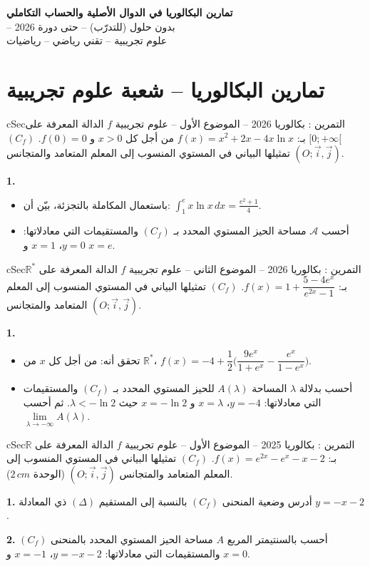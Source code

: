 \documentclass[12pt,a4paper]{article}
\newenvironment{BOX}[2]{\begin{otherlanguage}{english}\begin{arbox}{#1}{#2}}{\end{arbox}\end{otherlanguage}}
\newcounter{exo}
\newenvironment{tamrin}[1]{\stepcounter{exo}\begin{BOX}{cSec}{التمرين \theexo: #1}}{\end{BOX}}
\newenvironment{LTR}{\begin{otherlanguage}{english}}{\end{otherlanguage}}
\newcommand{\R}{\mathbb{R}}
\newenvironment{sq}{\begin{itemize}[leftmargin=2.4em,itemsep=3pt]}{\end{itemize}}
\newcommand{\qa}{\item[(أ)]}\newcommand{\qb}{\item[(ب)]}\newcommand{\qc}{\item[(جـ)]}\newcommand{\qd}{\item[(د)]}\newcommand{\qe}{\item[(هـ)]}
\newcommand{\QQ}[1]{\par\smallskip\textbf{#1.} }
\begin{document}
\begin{LTR}
\begin{tcolorbox}[enhanced,colback=cSec,colframe=cSec,arc=3mm,halign=center,boxrule=0pt,top=12pt,bottom=12pt,before upper={\selectlanguage{arabic}}]
{\color{white}\fontsize{22}{28}\selectfont\bfseries تمارين البكالوريا في الدوال الأصلية والحساب التكاملي}\\[8pt]
{\color{white}\large -- بدون حلول (للتدرّب) -- حتى دورة 2026}\\[5pt]
{\color{white}\large علوم تجريبية -- تقني رياضي -- رياضيات}
\end{tcolorbox}
\end{LTR}
\section{تمارين البكالوريا -- شعبة علوم تجريبية}
\begin{tamrin}{بكالوريا 2026 -- الموضوع الأول -- علوم تجريبية}
$f$ الدالة المعرفة على $[0;+\infty[$ بـ: $f(x)=x^2+2x-4x\ln x$ من أجل كل $x>0$ و $f(0)=0$.
$(C_f)$ تمثيلها البياني في المستوي المنسوب إلى المعلم المتعامد والمتجانس $(O;\vec i,\vec j)$.
\QQ{1}
\begin{sq}
\qa باستعمال المكاملة بالتجزئة، بيّن أن: $\displaystyle\int_1^e x\ln x\,dx=\frac{e^2+1}{4}$.
\qb أحسب $\mathcal{A}$ مساحة الحيز المستوي المحدد بـ $(C_f)$ والمستقيمات التي معادلاتها: $y=0$، $x=1$ و $x=e$.
\end{sq}
\end{tamrin}

\begin{tamrin}{بكالوريا 2026 -- الموضوع الثاني -- علوم تجريبية}
$f$ الدالة المعرفة على $\R^*$ بـ: $f(x)=1+\dfrac{5-4e^x}{e^{2x}-1}$.
$(C_f)$ تمثيلها البياني في المستوي المنسوب إلى المعلم المتعامد والمتجانس $(O;\vec i,\vec j)$.
\QQ{1}
\begin{sq}
\qa تحقق أنه: من أجل كل $x$ من $\R^*$، $f(x)=-4+\dfrac12\Big(\dfrac{9e^x}{1+e^x}-\dfrac{e^x}{1-e^x}\Big)$.
\qb أحسب بدلالة $\lambda$ المساحة $A(\lambda)$ للحيز المستوي المحدد بـ $(C_f)$ والمستقيمات التي معادلاتها: $y=-4$، $x=\lambda$ و $x=-\ln 2$ حيث $\lambda<-\ln 2$. ثم أحسب $\lim\limits_{\lambda\to-\infty}A(\lambda)$.
\end{sq}
\end{tamrin}

\begin{tamrin}{بكالوريا 2025 -- الموضوع الأول -- علوم تجريبية}
$f$ الدالة المعرفة على $\R$ بـ: $f(x)=e^{2x}-e^x-x-2$.
$(C_f)$ تمثيلها البياني في المستوي المنسوب إلى المعلم المتعامد والمتجانس $(O;\vec i,\vec j)$ (الوحدة $2\,cm$).
\QQ{1} أدرس وضعية المنحنى $(C_f)$ بالنسبة إلى المستقيم $(\Delta)$ ذي المعادلة $y=-x-2$.
\QQ{2} أحسب بالسنتيمتر المربع $A$ مساحة الحيز المستوي المحدد بالمنحنى $(C_f)$ والمستقيمات التي معادلاتها: $y=-x-2$، $x=-1$ و $x=0$.
\end{tamrin}
\end{document}
